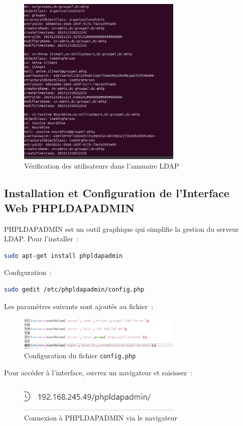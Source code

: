 \begin{figure}[h]
	\centering
	\includegraphics[width=0.7\textwidth]{LDAP/slapcat2.png}
	\caption{Vérification des utilisateurs dans l'annuaire LDAP}
	\label{fig:slapcat2}
\end{figure}

\subsection*{Installation et Configuration de l'Interface Web PHPLDAPADMIN}
PHPLDAPADMIN est un outil graphique qui simplifie la gestion du serveur LDAP. Pour l'installer :
\begin{lstlisting}[language=bash]
sudo apt-get install phpldapadmin
\end{lstlisting}

Configuration :
\begin{lstlisting}[language=bash]
sudo gedit /etc/phpldapadmin/config.php
\end{lstlisting}

Les paramètres suivants sont ajoutés au fichier :
\newpage
\begin{figure}[h]
	\centering
	\includegraphics[width=0.7\textwidth]{LDAP/conf.png}
	\caption{Configuration du fichier \texttt{config.php}}
	\label{fig:conf}
\end{figure}

Pour accéder à l'interface, ouvrez un navigateur et saisissez :
\begin{figure}[h]
	\centering
	\includegraphics[width=0.7\textwidth]{LDAP/t.png}
	\caption{Connexion à PHPLDAPADMIN via le navigateur}
	\label{fig:t}
\end{figure}

